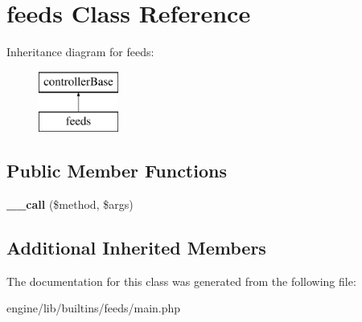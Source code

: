 \hypertarget{classfeeds}{\section{feeds Class Reference}
\label{classfeeds}
}
Inheritance diagram for feeds\-:\begin{figure}[H]
\begin{center}
\leavevmode
\includegraphics[height=2.000000cm]{classfeeds}
\end{center}
\end{figure}
\subsection*{Public Member Functions}
\begin{DoxyCompactItemize}
\item 
\hypertarget{classfeeds_a78a1e45b9170c42ac091d9395770a391}{{\bfseries \-\_\-\-\_\-call} (\$method, \$args)}\label{classfeeds_a78a1e45b9170c42ac091d9395770a391}

\end{DoxyCompactItemize}
\subsection*{Additional Inherited Members}


The documentation for this class was generated from the following file\-:\begin{DoxyCompactItemize}
\item 
engine/lib/builtins/feeds/main.\-php\end{DoxyCompactItemize}
